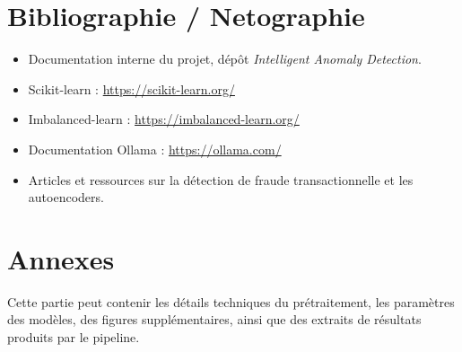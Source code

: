\documentclass[12pt,a4paper,twoside]{report}
\begin{document}
\chapter*{Bibliographie / Netographie}

\begin{itemize}
  \item Documentation interne du projet, dépôt \textit{Intelligent Anomaly Detection}.
  \item Scikit-learn : \url{https://scikit-learn.org/}
  \item Imbalanced-learn : \url{https://imbalanced-learn.org/}
  \item Documentation Ollama : \url{https://ollama.com/}
  \item Articles et ressources sur la détection de fraude transactionnelle et les autoencoders.
\end{itemize}

\appendix
\chapter{Annexes}

Cette partie peut contenir les détails techniques du prétraitement, les paramètres des modèles, des figures supplémentaires, ainsi que des extraits de résultats produits par le pipeline.
\end{document}

